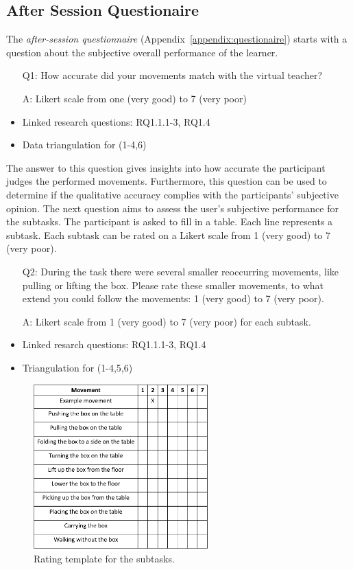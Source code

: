\subsection{After Session Questionaire}
The \textit{after-session questionnaire} (Appendix~\ref{appendix:questionaire}) starts with a question about the subjective overall performance of the learner. 
\begin{itemize}
	\item[Q1:] How accurate did your movements match with the virtual teacher?
	\item[A:] Likert scale from one (very good) to 7 (very poor)
	\item Linked research questions: RQ1.1.1-3, RQ1.4
	\item Data triangulation for (1-4,6)
\end{itemize}
The answer to this question gives insights into how accurate the participant judges the performed movements. Furthermore, this question can be used to determine if the qualitative accuracy complies with the participants' subjective opinion. The next question aims to assess the user's subjective performance for the subtasks. The participant is asked to fill in a table. Each line represents a subtask. Each subtask can be rated on a Likert scale from 1 (very good) to 7 (very poor).
\begin{itemize}
	\item[Q2:] During the task there were several smaller reoccurring movements, like pulling or lifting the box. Please rate these smaller movements, to what extend you could follow the movements: 1 (very good) to 7 (very poor).
	\item[A:] Likert scale from 1 (very good) to 7 (very poor) for each subtask.
	\item Linked resarch questions: RQ1.1.1-3, RQ1.4
	\item Triangulation for (1-4,5,6)
\end{itemize}

\begin{figure}[H]
	\centering
	\includegraphics[width=0.6\textwidth]{figures/sub-task-rating.png}
	\caption[Rating template: subtasks]{Rating template for the subtasks.}
	\label{fig:subtaskrating}
\end{figure}

